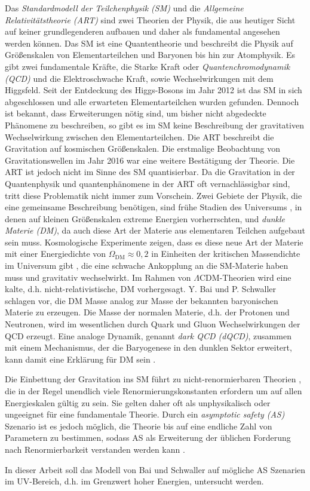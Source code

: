 Das \textit{Standardmodell der Teilchenphysik (SM)} und die 
\textit{Allgemeine Relativitätstheorie (ART)} sind zwei Theorien der 
Physik, die aus heutiger Sicht auf keiner grundlegenderen aufbauen und 
daher als fundamental angesehen werden können. Das SM ist eine Quantentheorie 
und beschreibt die Physik auf Größenskalen von Elementarteilchen und 
Baryonen bis hin zur Atomphysik. Es gibt zwei fundamentale Kräfte, 
die Starke Kraft oder \textit{Quantenchromodynamik (QCD)} und die 
Elektroschwache Kraft, sowie Wechselwirkungen mit dem Higgsfeld. Seit 
der Entdeckung des Higgs-Bosons im Jahr 2012 \cite{Higgs} ist das SM in sich 
abgeschlossen und alle erwarteten Elementarteilchen wurden gefunden.  
Dennoch ist bekannt, dass Erweiterungen nötig sind, um bisher nicht abgedeckte 
Phänomene zu beschreiben, so gibt es im SM keine Beschreibung der gravitativen 
Wechselwirkung zwischen den Elementarteilchen. Die ART beschreibt die 
Gravitation auf kosmischen Größenskalen. Die erstmalige Beobachtung von 
Gravitationswellen im Jahr 2016 \cite{gravitational_waves} war eine weitere 
Bestätigung der Theorie. Die ART ist jedoch nicht im Sinne des SM 
quantisierbar. Da die Gravitation in der Quantenphysik und quantenphänomene 
in der ART oft vernachlässigbar sind, tritt diese Problematik nicht immer zum 
Vorschein. Zwei Gebiete der Physik, die eine gemeinsame 
Beschreibung benötigen, sind frühe Stadien des Universums 
\cite{GR_Introductory}, in denen auf kleinen 
Größenskalen extreme Energien vorherrschten, und \textit{dunkle Materie (DM)}, 
da auch diese Art der Materie aus elementaren Teilchen aufgebaut sein muss.
Kosmologische Experimente zeigen, dass es diese neue Art der Materie mit einer 
Energiedichte von $\Omega_\text{DM}\approx 0,2$ in Einheiten der kritischen 
Massendichte im Universum gibt \cite{PDG:DM}, die eine schwache 
Ankopplung an die SM-Materie haben muss und gravitativ wechselwirkt. 
Im Rahmen von $\Lambda$CDM-Theorien wird eine kalte, d.h. 
nicht-relativistische, DM vorhergesagt. 
Y. Bai und P. Schwaller schlagen vor, 
die DM Masse analog zur Masse der bekannten baryonischen Materie zu erzeugen.  
Die Masse der normalen Materie, d.h. der Protonen und Neutronen, wird im 
wesentlichen durch Quark und Gluon Wechselwirkungen der 
QCD erzeugt. Eine analoge Dynamik, genannt 
\textit{dark QCD (dQCD)}, zusammen mit einem Mechanismus, der die 
Baryogenese in den dunklen Sektor erweitert, kann damit eine  
Erklärung für DM sein \cite{Scale_of_dark_QCD}. 

Die Einbettung der Gravitation ins SM führt zu nicht-renormierbaren Theorien 
\cite{GR_Weinberg}, die in der Regel unendlich 
viele Renormierungskonstanten erfordern um auf allen Energieskalen gültig 
zu sein. Sie gelten daher oft als unphysikalisch oder ungeeignet für   
eine fundamentale Theorie. Durch ein \textit{asymptotic safety (AS)} 
Szenario ist es jedoch möglich, die Theorie bis auf eine endliche Zahl von 
Parametern zu bestimmen, sodass AS als Erweiterung der üblichen Forderung 
nach Renormierbarkeit verstanden werden kann \cite{GR_Weinberg}
\cite{Weinberg:1976}.

In dieser Arbeit soll das \QCDxdQCD Modell von Bai und Schwaller auf 
mögliche AS Szenarien im UV-Bereich, d.h. im Grenzwert hoher Energien, 
untersucht werden. 
    